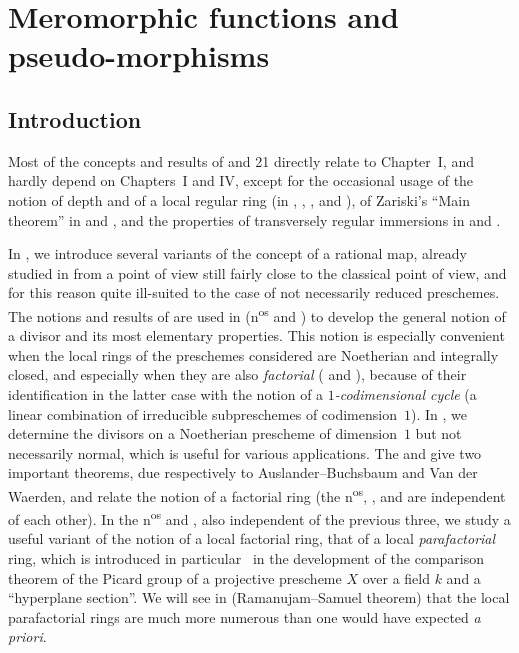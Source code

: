 \section{Meromorphic functions and pseudo-morphisms}
\label{IV.20}

\setcounter{subsection}{-1}
\subsection{Introduction}
\label{IV.20.0}

Most of the concepts and results of \textsection{} and 21 directly relate to Chapter~I, and hardly depend on Chapters~I and IV, except for the occasional usage of the notion of depth and of a local regular ring (in , , , and ), of Zariski's ``Main theorem'' in  and , and the properties of transversely regular immersions in  and .

In , we introduce several variants of the concept of a rational map, already studied in  from a point of view still fairly close to the classical point of view, and for this reason quite ill-suited to the case of not necessarily reduced preschemes.
The notions and results of  are used in  (n\textsuperscript{os} and ) to develop the general notion of a divisor and its most elementary properties.
This notion is especially convenient when the local rings of the preschemes considered are Noetherian and integrally closed, and especially when they are also \emph{factorial} ( and ), because of their identification in the latter case with the notion of a \emph{$1$-codimensional cycle} (a linear combination of irreducible subpreschemes of codimension~$1$).
In ,  we determine the divisors on a Noetherian prescheme of dimension~$1$ but not necessarily normal, which is useful for various applications.
The  and  give two important theorems, due respectively to Auslander--Buchsbaum and Van der Waerden, and relate the notion of a factorial ring (the n\textsuperscript{os}, , and  are independent of each other).
In the n\textsuperscript{os} and , also independent of the previous three, we study a useful variant of the notion of a local factorial ring, that of a local \emph{parafactorial} ring, which is introduced in particular~\cite{IV-41} in the development of the comparison theorem of the Picard group of a projective prescheme $X$ over a field $k$ and a ``hyperplane section''.
We will see in  (Ramanujam--Samuel theorem) that the local parafactorial rings are much more numerous than one would have expected \emph{a priori}.

